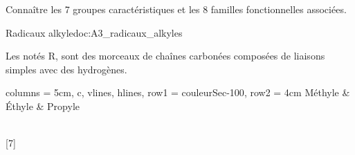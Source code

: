 \tetePremStssOrga
\vspace*{-34pt}

\begin{objectifs}
  \item Connaître les 7 groupes caractéristiques et les 8 familles fonctionnelles associées.
\end{objectifs}



\begin{doc}{Radicaux alkyle}{doc:A3_radicaux_alkyles}
  \begin{importants}
    Les  notés R, sont des morceaux de chaînes carbonées composées de liaisons simples avec des hydrogènes.
  \end{importants}

  \centering
  \begin{tblr}{
    columns = {5cm, c}, vlines, hlines,
    row{1} = {couleurSec-100},
    row{2} = {4cm}
  }
    Méthyle & Éthyle & Propyle \\
    \\
  \end{tblr}
\end{doc}

[7]


